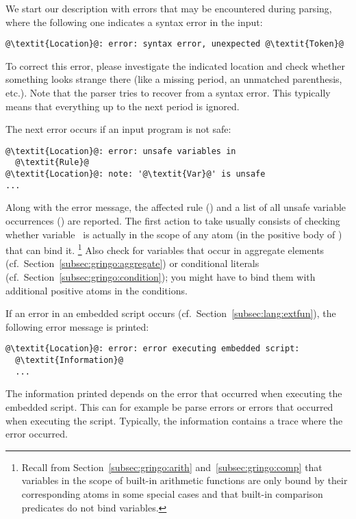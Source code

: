 We start our description with errors that may be encountered during parsing,
where the following one indicates a syntax error in the input:
%
\begin{lstlisting}[numbers=none,escapechar=@]
@\textit{Location}@: error: syntax error, unexpected @\textit{Token}@
\end{lstlisting}
%
To correct this error, please investigate the indicated location
and check whether something looks strange there
(like a missing period, an unmatched parenthesis, etc.).
Note that the parser tries to recover from a syntax error.
This typically means that everything up to the next period is ignored.

The next error occurs if an input program is not safe:
%
\begin{lstlisting}[numbers=none,escapechar=@]
@\textit{Location}@: error: unsafe variables in
  @\textit{Rule}@
@\textit{Location}@: note: '@\textit{Var}@' is unsafe
...
\end{lstlisting}
%
Along with the error message,
the affected rule () and a list of all unsafe variable occurrences () are reported.
The first action to take usually consists of checking whether
variable~ is actually in the scope of any atom
(in the positive body of ) that can bind it.%
\footnote{%
  Recall from Section~\ref{subsec:gringo:arith} and~\ref{subsec:gringo:comp}
  that variables in the scope of built-in arithmetic functions are only bound by their corresponding atoms in some special cases 
  and that built-in comparison predicates do not bind variables.}
Also check for variables that occur in aggregate elements (cf.\ Section~\ref{subsec:gringo:aggregate}) or conditional literals (cf.\ Section~\ref{subsec:gringo:condition});
you might have to bind them with additional positive atoms in the conditions.

If an error in an embedded script occurs (cf.~Section~\ref{subsec:lang:extfun}), the following error message is printed:
%
\begin{lstlisting}[numbers=none,escapechar=@]
@\textit{Location}@: error: error executing embedded script:
  @\textit{Information}@
  ...
\end{lstlisting}
%
The information printed depends on the error that occurred when executing the embedded script.
This can for example be parse errors or errors that occurred when executing the script.
Typically, the information contains a trace where the error occurred.

